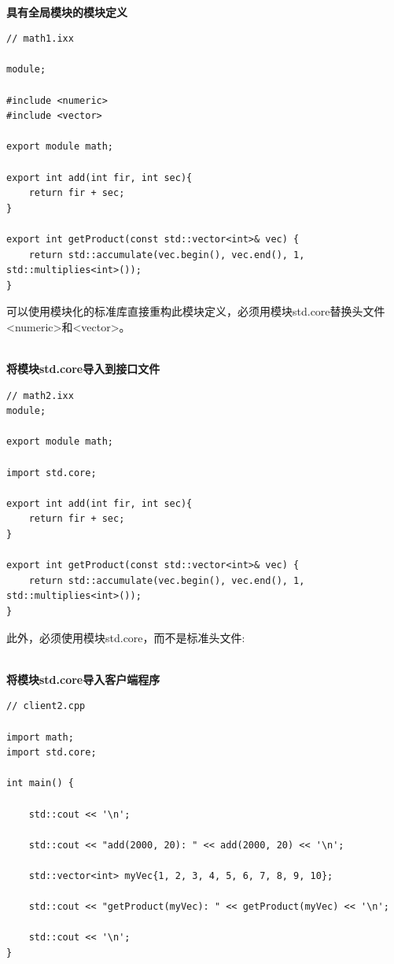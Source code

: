 \hspace*{\fill} \\ %
\noindent
\textbf{具有全局模块的模块定义}
\begin{lstlisting}[style=styleCXX]
// math1.ixx

module;

#include <numeric>
#include <vector>

export module math;

export int add(int fir, int sec){
	return fir + sec;
}

export int getProduct(const std::vector<int>& vec) {
	return std::accumulate(vec.begin(), vec.end(), 1, std::multiplies<int>());
}
\end{lstlisting}

可以使用模块化的标准库直接重构此模块定义，必须用模块std.core替换头文件<numeric>和<vector>。

\hspace*{\fill} \\ %
\noindent
\textbf{将模块std.core导入到接口文件}
\begin{lstlisting}[style=styleCXX]
// math2.ixx
module;

export module math;

import std.core;

export int add(int fir, int sec){
	return fir + sec;
}

export int getProduct(const std::vector<int>& vec) {
	return std::accumulate(vec.begin(), vec.end(), 1, std::multiplies<int>());
}
\end{lstlisting}

此外，必须使用模块std.core，而不是标准头文件:

\hspace*{\fill} \\ %
\noindent
\textbf{将模块std.core导入客户端程序}
\begin{lstlisting}[style=styleCXX]
// client2.cpp

import math;
import std.core;

int main() {
	
	std::cout << '\n';
	
	std::cout << "add(2000, 20): " << add(2000, 20) << '\n';
	
	std::vector<int> myVec{1, 2, 3, 4, 5, 6, 7, 8, 9, 10};
	
	std::cout << "getProduct(myVec): " << getProduct(myVec) << '\n';
	
	std::cout << '\n';
}
\end{lstlisting}

